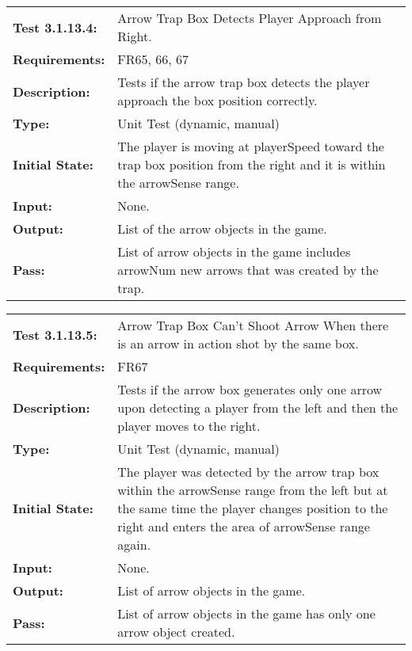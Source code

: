 \documentclass[12pt, titlepage]{article}
\begin{document}
\begin{tabular}{|l|p{10cm}|}
    \hline
    \bf{Test} 3.1.13.4: & Arrow Trap Box Detects Player Approach from Right.\\
    \bf{Requirements}: & FR65, 66, 67\\
    \bf{Description}: & Tests if the arrow trap box detects the player approach the box position correctly. \\
    \bf{Type}: & Unit Test (dynamic, manual) \\
    \bf{Initial State}: & The player is moving at playerSpeed toward the trap box position from the right and it is within the arrowSense range. \\
    \bf{Input}: & None.\\
    \bf{Output}: & List of the arrow objects in the game. \\
    \bf{Pass}: & List of arrow objects in the game includes arrowNum new arrows that was created by the trap. \\
    \hline
\end{tabular}

\begin{tabular}{|l|p{10cm}|}
    \hline
    \bf{Test} 3.1.13.5: & Arrow Trap Box Can't Shoot Arrow When there is an arrow in action shot by the same box.\\
    \bf{Requirements}: & FR67\\
    \bf{Description}: & Tests if the arrow box generates only one arrow upon detecting a player from the left and then the player moves to the right. \\
    \bf{Type}: & Unit Test (dynamic, manual) \\
    \bf{Initial State}: & The player was detected by the arrow trap box within the arrowSense range from the left but at the same time the player changes position to the right and enters the area of arrowSense range again.\\
    \bf{Input}: & None.\\
    \bf{Output}: & List of arrow objects in the game.\\
    \bf{Pass}: & List of arrow objects in the game has only one arrow object created.\\
    \hline
\end{tabular}
\end{document}
